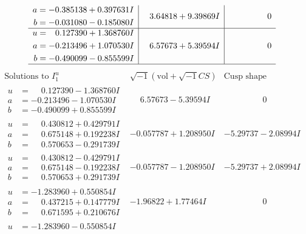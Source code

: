 \documentclass[1p]{elsarticle_modified}
\theoremstyle{definition}
\newcommand{\I}{\sqrt{-1}}
\begin{document}
$$\begin{array}{c|c|c}
\begin{aligned}
a &= -0.385138 + 0.397631 I \\
b &= -0.031080 - 0.185080 I\end{aligned}
 & \phantom{-}3.64818 + 9.39869 I & \phantom{-0.000000 } 0 \\ \hline\begin{aligned}
u &= \phantom{-}0.127390 + 1.368760 I \\
a &= -0.213496 + 1.070530 I \\
b &= -0.490099 - 0.855599 I\end{aligned}
 & \phantom{-}6.57673 + 5.39594 I & \phantom{-0.000000 } 0\\
 \hline 
 \end{array}$$\newpage$$\begin{array}{c|c|c}  
\text{Solutions to }I^u_{1}& \I (\text{vol} + \sqrt{-1}CS) & \text{Cusp shape}\\
 \hline 
\begin{aligned}
u &= \phantom{-}0.127390 - 1.368760 I \\
a &= -0.213496 - 1.070530 I \\
b &= -0.490099 + 0.855599 I\end{aligned}
 & \phantom{-}6.57673 - 5.39594 I & \phantom{-0.000000 } 0 \\ \hline\begin{aligned}
u &= \phantom{-}0.430812 + 0.429791 I \\
a &= \phantom{-}0.675148 + 0.192238 I \\
b &= \phantom{-}0.570653 - 0.291739 I\end{aligned}
 & -0.057787 + 1.208950 I & -5.29737 - 2.08994 I \\ \hline\begin{aligned}
u &= \phantom{-}0.430812 - 0.429791 I \\
a &= \phantom{-}0.675148 - 0.192238 I \\
b &= \phantom{-}0.570653 + 0.291739 I\end{aligned}
 & -0.057787 - 1.208950 I & -5.29737 + 2.08994 I \\ \hline\begin{aligned}
u &= -1.283960 + 0.550854 I \\
a &= \phantom{-}0.437215 + 0.147779 I \\
b &= \phantom{-}0.671595 + 0.210676 I\end{aligned}
 & -1.96822 + 1.77464 I & \phantom{-0.000000 } 0 \\ \hline\begin{aligned}
u &= -1.283960 - 0.550854 I \\

\end{aligned}
\end{array}$$
\end{document}
